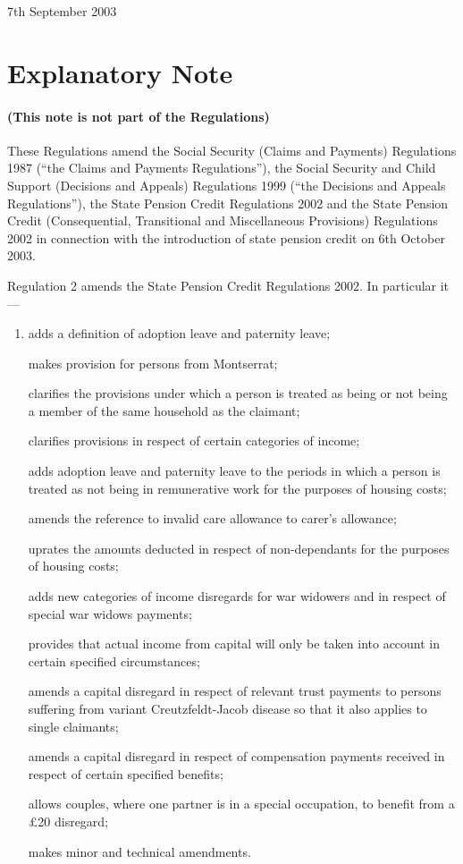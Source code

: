 \documentclass[12pt,a4paper]{article}
\begin{document}
7th September 2003

\small

\part{Explanatory Note}

\renewcommand\parthead{— Explanatory Note}

\subsection*{(This note is not part of the Regulations)}

These Regulations amend the Social Security (Claims and Payments) Regulations 1987 (“the Claims and Payments Regulations”), the Social Security and Child Support (Decisions and Appeals) Regulations 1999 (“the Decisions and Appeals Regulations”), the State Pension Credit Regulations 2002 and the State Pension Credit (Consequential, Transitional and Miscellaneous Provisions) Regulations 2002 in connection with the introduction of state pension credit on 6th October 2003.

Regulation 2 amends the State Pension Credit Regulations 2002. In particular it—
\begin{enumerate}\item[]
    adds a definition of adoption leave and paternity leave;

    makes provision for persons from Montserrat;

    clarifies the provisions under which a person is treated as being or not being a member of the same household as the claimant;

    clarifies provisions in respect of certain categories of income;

    adds adoption leave and paternity leave to the periods in which a person is treated as not being in remunerative work for the purposes of housing costs;

    amends the reference to invalid care allowance to carer’s allowance;

    uprates the amounts deducted in respect of non-dependants for the purposes of housing costs;

    adds new categories of income disregards for war widowers and in respect of special war widows payments;

    provides that actual income from capital will only be taken into account in certain specified circumstances;

    amends a capital disregard in respect of relevant trust payments to persons suffering from variant Creutzfeldt-Jacob disease so that it also applies to single claimants;

    amends a capital disregard in respect of compensation payments received in respect of certain specified benefits;

    allows couples, where one partner is in a special occupation, to benefit from a £20 disregard;

    makes minor and technical amendments. 
\end{enumerate}
\end{document}

